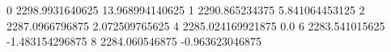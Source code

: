 0 2298.9931640625 13.968994140625
1 2290.865234375 5.841064453125
2 2287.0966796875 2.072509765625
4 2285.024169921875 0.0
6 2283.541015625 -1.483154296875
8 2284.060546875 -0.963623046875
